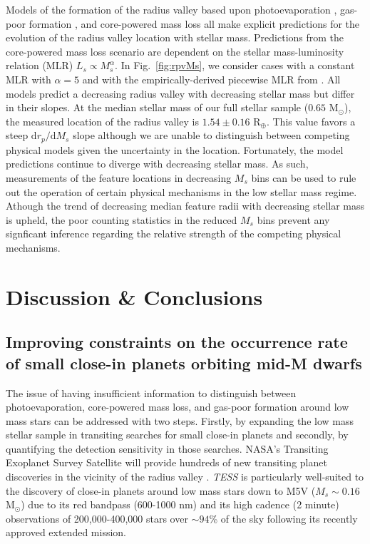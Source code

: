 \documentclass[twocolumn]{emulateapj}
\newcommand{\tess}[1]{\emph{TESS}#1}
\begin{document}
Models of the formation of the radius valley based upon photoevaporation \citep{wu19}, gas-poor formation \citep{lopez18},
and core-powered mass loss \citep{gupta19b} all make explicit predictions for the evolution of the radius valley location
with stellar mass. Predictions from the core-powered mass loss scenario are dependent on the stellar mass-luminosity
relation (MLR) $L_s \propto M_s^{\alpha}$. In Fig.~\ref{fig:rpvMs}, we consider cases with a constant MLR with $\alpha=5$
\citep{gupta19b} and with the empirically-derived piecewise MLR from \cite{eker18}. All models predict a decreasing
radius valley with decreasing stellar mass but differ in their slopes. 
At the median stellar mass of our full stellar sample ($0.65$ M$_{\odot}$), the measured location of the radius valley is
$1.54\pm 0.16$ R$_{\oplus}$. This value favors a steep $\text{d}r_p / \text{d}M_s$ slope although we are unable to distinguish
between competing physical models given the uncertainty in the location. Fortunately, the model predictions continue to diverge
with decreasing stellar mass. As such, measurements of the feature locations in decreasing $M_s$ bins can be used to
rule out the operation of certain physical mechanisms in the low stellar mass regime. Athough the trend of decreasing
median feature radii with decreasing stellar mass is upheld, the poor counting statistics in the reduced $M_s$ bins
prevent any signficant inference regarding the relative strength of the competing physical mechanisms.

\section{Discussion \& Conclusions} \label{sect:conclusion}
\subsection{Improving constraints on the occurrence rate of small close-in planets orbiting mid-M dwarfs}
The issue of having insufficient information to distinguish between photoevaporation, core-powered mass loss, and gas-poor
formation around low mass stars can be addressed with two steps. Firstly, by expanding the low mass stellar sample in transiting
searches for small close-in planets and secondly, by quantifying the detection sensitivity in those searches. 
NASA's Transiting Exoplanet Survey Satellite \citep[\tess{;}][]{ricker15} will provide hundreds of new transiting planet
discoveries in the vicinity of the radius valley \citep{barclay18}. \tess{} is particularly well-suited to the discovery of
close-in planets around low mass stars down to M5V ($M_s\sim 0.16$ M$_{\odot}$) due to its red bandpass (600-1000 nm)
and its high cadence (2 minute) observations of 200,000-400,000 stars over $\sim 94$\% of the sky following its recently
approved extended mission.
\end{document}
